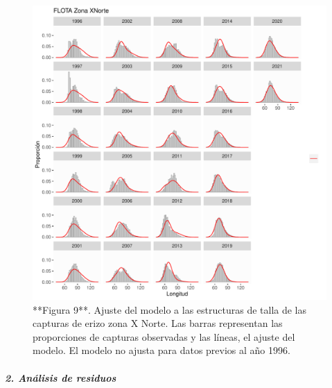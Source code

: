\documentclass[
]{article}
\begin{document}
\begin{figure}

{\centering \includegraphics{Figuras/Fig_ajustesCompFXN-1} 

}

\caption{**Figura 9**. Ajuste del modelo a las estructuras de talla de las capturas de erizo zona X Norte. Las barras representan las proporciones de capturas observadas y las líneas, el ajuste del modelo. El modelo no ajusta para datos previos al año 1996.}\label{fig:Fig_ajustesCompFXN}
\end{figure}

\hypertarget{anuxe1lisis-de-residuos}{%
\subparagraph{\texorpdfstring{\textbf{\emph{2. Análisis de
residuos}}}{2. Análisis de residuos}}\label{anuxe1lisis-de-residuos}}
\end{document}
